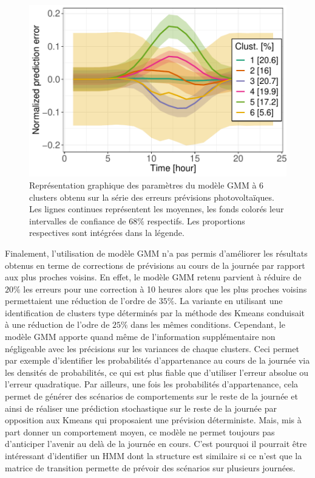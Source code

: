 \documentclass[12pt]{report}
\begin{document}
\begin{figure}[htbp]
	\centering
	\includegraphics[width = 0.75 \linewidth]{Images/PV/GMM/GMM_MeansVars_6_dim24.pdf}
	\caption{Représentation graphique des paramètres du modèle GMM à 6 clusters obtenu sur la série des erreurs prévisions photovoltaïques. Les lignes continues représentent les moyennes, les fonds colorés leur intervalles de confiance de $68 \%$ respectifs. Les proportions respectives sont intégrées dans la légende.}
	\label{fig:PV_GMM_MeanVarProp}
\end{figure}


Finalement, l'utilisation de modèle GMM n'a pas permis d'améliorer les résultats obtenus en terme de corrections de prévisions au cours de la journée par rapport aux plus proches voisins. En effet, le modèle GMM retenu parvient à réduire de $20 \%$ les erreurs pour une correction à 10 heures alors que les plus proches voisins permettaient une réduction de l'ordre de $35 \%$. La variante en utilisant une identification de clusters type déterminés par la méthode des Kmeans conduisait à une réduction de l'odre de $25 \%$ dans les mêmes conditions. Cependant, le modèle GMM apporte quand même de l'information supplémentaire non négligeable avec les précisions sur les variances de chaque clusters. Ceci permet par exemple d'identifier les probabilités d'appartenance au cours de la journée via les densités de probabilités, ce qui est plus fiable que d'utiliser l'erreur absolue ou l'erreur quadratique. Par ailleurs, une fois les probabilités d'appartenance, cela permet de générer des scénarios de comportements sur le reste de la journée et ainsi de réaliser une prédiction stochastique sur le reste de la journée par opposition aux Kmeans qui proposaient une prévision déterministe. Mais, mis à part donner un comportement moyen, ce modèle ne permet toujours pas d'anticiper l'avenir au delà de la journée en cours. C'est pourquoi il pourrait être intéressant d'identifier un HMM dont la structure est similaire si ce n'est que la matrice de transition permette de prévoir des scénarios sur plusieurs journées.  
\end{document}
